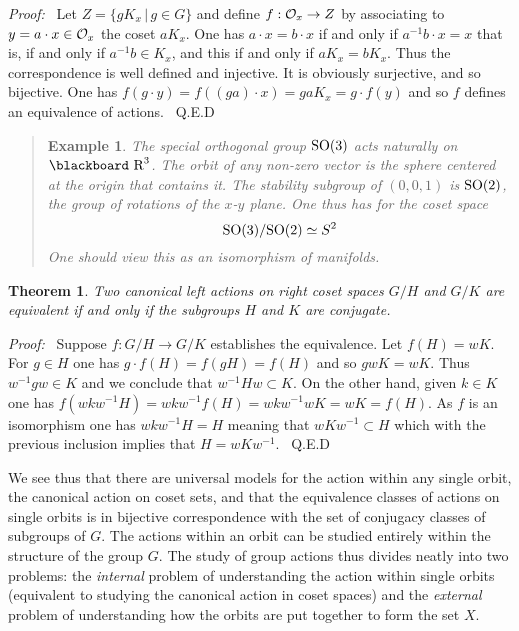 \documentclass[12pt,titlepage]{article}
\def\bbf#1{\hbox{\blackboard #1}}
\def\lR{\bbf R}
\def\cO{{\cal O}}
\def\SO{\hbox{SO}}
\newtheorem{theorem}{Theorem}
\newtheorem{eg}{Example}
\newenvironment{proof}{{\em Proof:\/}\ }{\ Q.E.D}
\newenvironment{example}{\begin{quote}\begin{eg}}{\end{eg}\end{quote}}
\begin{document}
\begin{proof} Let \(Z=\{gK_x\,|\,g\in G\}\) and define \(f:\cO_x \to Z\)
by associating to \(y=a\cdot x\in \cO_x\) the coset
\(aK_x\). One has \(a\cdot x = b\cdot x\) if and only if \(a^{-1}b \cdot
x = x\) that is, if and only if \(a^{-1}b \in K_x\), and this if and
only if \(aK_x = bK_x\). Thus the
correspondence is well defined and injective. It is obviously
surjective, and so bijective.   One has
\(f(g\cdot y) = f((ga)\cdot x) = gaK_x = g\cdot f(y)\) and so
\(f\)
defines an equivalence of actions.
\end{proof}%
 
\begin{example}
The special orthogonal group \(\SO(3)\) acts naturally on \(\lR^3\). The
orbit of any non-zero vector is the sphere centered at the origin that
 contains it. The
stability subgroup of \((0,0,1)\) is \(\SO(2)\), the group of rotations
of the \(x\)-\(y\) plane. One thus has for the coset space 
\[
\SO(3)/\SO(2)\simeq S^2
\]%
One should view this as an isomorphism of manifolds.
\end{example}

\begin{theorem}
Two canonical left actions on right coset spaces \(G/H\) and \(G/K\) are
equivalent if and only if the subgroups \(H\) and \(K\) are conjugate.
\end{theorem}%

\begin{proof}
Suppose \(f: G/H \to G/K\) establishes the equivalence. Let \(f(H) = wK\). 
For \(g\in H\) one has \(g\cdot f(H) = f(gH)=f(H)\)
and so \(gwK = wK\). Thus \(w^{-1}gw\in K\) and we conclude that
\(w^{-1}Hw \subset K\). On the other hand, given \(k\in K\) one has
\(f(wkw^{-1}H)=wkw^{-1}f(H)=wkw^{-1}wK=wK=f(H)\). As \(f\)
is an isomorphism one has \(wkw^{-1}H = H\) meaning that \(wKw^{-1}
\subset H\) which with the previous inclusion implies that
\(H=wKw^{-1}\).
\end{proof}%

We see thus that there are universal models for the action within any
single orbit, the canonical action on coset sets, and that the
equivalence classes of actions on  single orbits is in bijective
correspondence with
the set of conjugacy classes of subgroups of \(G\).  The actions within
an orbit can be studied
entirely within the structure of the group \(G\).
The
study of group actions thus divides neatly into two problems: the {\em
internal\/} problem of understanding the action within single orbits
(equivalent to studying the canonical action in coset spaces) and the
{\em external\/} problem of understanding how the orbits are put together
to form the set \(X\).
\end{document}
